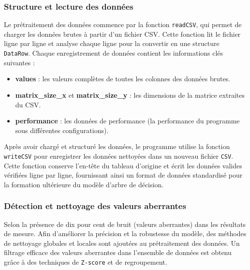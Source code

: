 \documentclass{rapportECL2024}
\begin{document}
\subsubsection{Structure et lecture des données}
Le prétraitement des données commence par la fonction \texttt{readCSV}, qui permet de charger les données brutes à partir d'un fichier CSV. Cette fonction lit le fichier ligne par ligne et analyse chaque ligne pour la convertir en une structure \texttt{DataRow}. Chaque enregistrement de données contient les informations clés suivantes :
\begin{itemize}
    \item \textbf{values} : les valeurs complètes de toutes les colonnes des données brutes.
    \item \textbf{matrix\_size\_x} et \textbf{matrix\_size\_y} : les dimensions de la matrice extraites du CSV.
    \item \textbf{performance} : les données de performance (la performance du programme sous différentes configurations).
\end{itemize}
Après avoir chargé et structuré les données, le programme utilise la fonction 
 \texttt{writeCSV} pour enregistrer les données nettoyées dans un nouveau fichier \texttt{CSV}. Cette fonction conserve l'en-tête du tableau d'origine et écrit les données valides vérifiées ligne par ligne, fournissant ainsi un format de données standardisé pour la formation ultérieure du modèle d'arbre de décision.
\subsubsection{Détection et nettoyage des valeurs aberrantes}
Selon la présence de dix pour cent de bruit (valeurs aberrantes) dans les résultats de mesure. Afin d'améliorer la précision et la robustesse du modèle, des méthodes de nettoyage globales et locales sont ajoutées au prétraitement des données. Un filtrage efficace des valeurs aberrantes dans l'ensemble de données est obtenu grâce à des techniques de \texttt{Z-score} et de regroupement.
\end{document}
